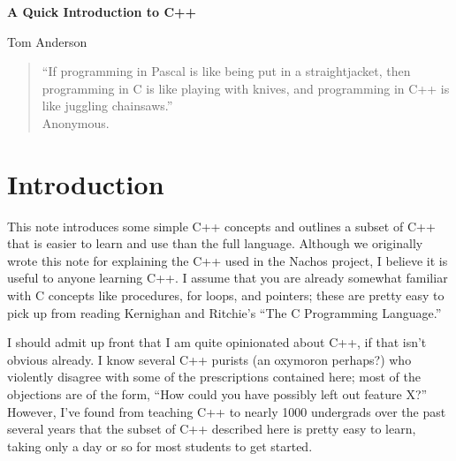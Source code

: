 
\newcommand{\putfig}[3]%
{\begin{figure}%
\centerline{%
\psfig{figure=#1.ps,width=#3}}%
\caption{#2}%
\label{fig:#1}%
\end{figure}}





\begin{figure*}[t]
\begin{center}
{\LARGE\bf A Quick Introduction to C++}

\vspace{3.0ex}

{\Large Tom Anderson}
\end{center}
\end{figure*}

\renewcommand{\thefootnote}{\fnsymbol{footnote}}


\renewcommand{\thefootnote}{}
\renewcommand{\thefootnote}{\arabic{footnote}}

\begin{quote}
``If programming in Pascal is like being put in a straightjacket,
then programming in C is like playing with knives, and programming
in C++ is like juggling chainsaws.'' \\ \hbox{} \hfill Anonymous.
\end{quote}

\section{Introduction}

This note introduces some simple C++ concepts and outlines a
subset of C++ that is easier to learn and use than
the full language.  Although we originally wrote this note for
explaining the C++ used in the Nachos project, I believe it is
useful to anyone learning C++.
I assume that you are already somewhat familiar with C concepts
like procedures, for loops, and pointers; these are pretty easy
to pick up from reading Kernighan and Ritchie's ``The C Programming
Language.''

I should admit up front that I am quite opinionated about C++, if
that isn't obvious already.
I know several C++ purists (an oxymoron perhaps?) who violently
disagree with some of
the prescriptions contained here; most of the objections are of
the form, ``How could you have possibly left out feature X?''
However, I've found from teaching C++ to nearly 1000 undergrads
over the past several years that the subset of C++ described here is
pretty easy to learn, taking only a day or so for most students
to get started.

